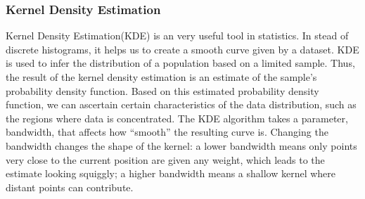 \documentclass{article}\usepackage[]{graphicx}\usepackage[]{xcolor}
\begin{document}
\subsubsection{Kernel Density Estimation}
Kernel Density Estimation(KDE) is an very useful tool in statistics. In stead of discrete histograms, it helps us to create a smooth curve given by a dataset. KDE is used to infer the distribution of a population based on a limited sample. Thus, the result of the kernel density estimation is an estimate of the sample's probability density function. Based on this estimated probability density function, we can ascertain certain characteristics of the data distribution, such as the regions where data is concentrated.
The KDE algorithm takes a parameter, bandwidth, that affects how “smooth” the resulting curve is. Changing the bandwidth changes the shape of the kernel: a lower bandwidth means only points very close to the current position are given any weight, which leads to the estimate looking squiggly; a higher bandwidth means a shallow kernel where distant points can contribute.
\end{document}

